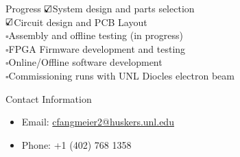 \documentclass[final]{beamer}
\newlength{\onecolwide}
\newcommand{\checkedbox}{\textcolor{dgreen}{$\text{\rlap{$\checkmark$}}\square$}}
\newcommand{\checkbox}{$\square$}
\begin{document}
\begin{frame}[t]
\begin{columns}[t]
  \begin{column}{\onecolwide}
    \begin{alertblock}{Progress}
      \checkedbox System design and parts selection \\
      \checkedbox Circuit design and PCB Layout \\
      \checkbox Assembly and offline testing (in progress)\\
      \checkbox FPGA Firmware development and testing \\
      \checkbox Online/Offline software development \\
      \checkbox Commissioning runs with UNL Diocles electron beam
    \end{alertblock}
    \begin{alertblock}{Contact Information}
      \begin{itemize}
      \item Email: \href{mailto:cfangmeier2@huskers.unl.edu}{cfangmeier2@huskers.unl.edu}
      \item Phone: +1 (402) 768 1358
      \end{itemize}
    \end{alertblock}
  \end{column}
\end{columns}


\end{frame}
\end{document}
